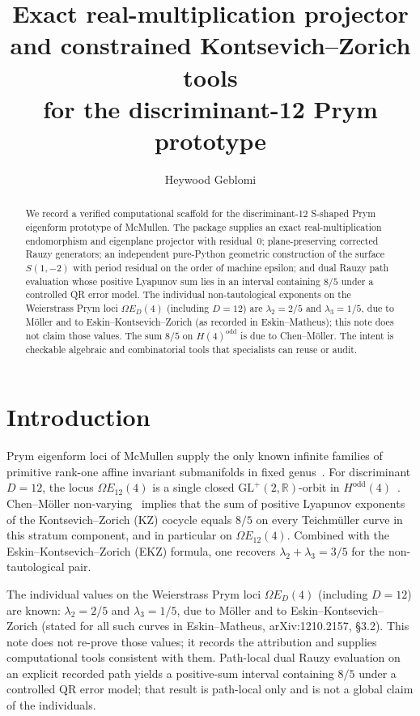 \documentclass[11pt,a4paper]{article}
\title{Exact real-multiplication projector and constrained Kontsevich--Zorich tools\\
for the discriminant-12 Prym prototype}
\author{Heywood Geblomi}
\date{}
\theoremstyle{definition}
\begin{document}
\maketitle

\begin{abstract}
We record a verified computational scaffold for the discriminant-12 S-shaped Prym eigenform prototype of McMullen.
The package supplies an exact real-multiplication endomorphism and eigenplane projector with residual~$0$;
plane-preserving corrected Rauzy generators;
an independent pure-Python geometric construction of the surface $S(1,-2)$ with period residual on the order of machine epsilon;
and dual Rauzy path evaluation whose positive Lyapunov sum lies in an interval containing $8/5$ under a controlled QR error model.
The individual non-tautological exponents on the Weierstrass Prym loci $\Omega E_D(4)$ (including $D=12$) are $\lambda_2=2/5$ and $\lambda_3=1/5$, due to M\"oller and to Eskin--Kontsevich--Zorich (as recorded in Eskin--Matheus); this note does not claim those values.
The sum $8/5$ on $H(4)^{\mathrm{odd}}$ is due to Chen--M\"oller.
The intent is checkable algebraic and combinatorial tools that specialists can reuse or audit.
\end{abstract}

\section{Introduction}

Prym eigenform loci of McMullen supply the only known infinite families of primitive rank-one affine invariant submanifolds in fixed genus~\cite{McMullen2006}.
For discriminant $D=12$, the locus $\Omega E_{12}(4)$ is a single closed $\mathrm{GL}^+(2,\mathbb{R})$-orbit in $H^{\mathrm{odd}}(4)$~\cite{LanneauNguyen2014,LanneauNguyenComponents}.
Chen--M\"oller non-varying~\cite{ChenMoller2012} implies that the sum of positive Lyapunov exponents of the Kontsevich--Zorich (KZ) cocycle equals $8/5$ on every Teichm\"uller curve in this stratum component, and in particular on $\Omega E_{12}(4)$.
Combined with the Eskin--Kontsevich--Zorich (EKZ) formula, one recovers $\lambda_2+\lambda_3=3/5$ for the non-tautological pair.

The individual values on the Weierstrass Prym loci $\Omega E_D(4)$ (including $D=12$) are known: $\lambda_2=2/5$ and $\lambda_3=1/5$, due to M\"oller and to Eskin--Kontsevich--Zorich (stated for all such curves in Eskin--Matheus, arXiv:1210.2157, \S3.2).
This note does not re-prove those values; it records the attribution and supplies computational tools consistent with them.
Path-local dual Rauzy evaluation on an explicit recorded path yields a positive-sum interval containing $8/5$ under a controlled QR error model; that result is path-local only and is not a global claim of the individuals.
\end{document}
